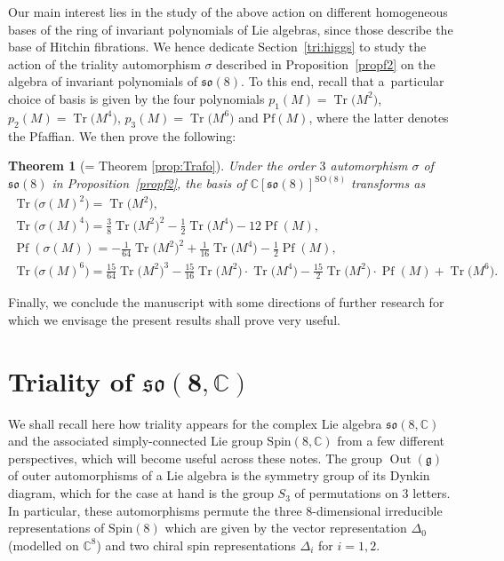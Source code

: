 \documentclass[10pt,a4paper]{amsart}
\numberwithin{equation}{section}
\newcommand{\Pf}{\operatorname{Pf}}
\newcommand{\Tr}{\operatorname{Tr}}
\newtheorem{Theorem}{Theorem}[section]
\begin{document}
Our main interest lies in the study of the above action on different homogeneous bases of the ring of invariant polynomials of Lie algebras, since those describe the base of Hitchin fibrations. We hence dedicate Section~\ref{tri:higgs} to study the action of the triality automorphism $\sigma$ described in Proposition~\ref{propf2} on the algebra of invariant polynomials of $\mathfrak{so}(8)$. To this end, recall that a~particular choice of basis is given by the four polynomials $p_1(M) = \Tr\big(M^2\big)$, $p_2 (M) = \Tr\big(M^4\big)$, $p_3 (M) = \Tr\big(M^6\big)$ and $\mathrm{Pf}(M)$, where the latter denotes the Pfaffian. We then prove the following:

\begin{Theorem}[= Theorem \ref{prop:Trafo}] Under the order $3$ automorphism $\sigma$ of $\mathfrak{so}(8)$ in Proposition~{\rm \ref{propf2}}, the basis of $\mathbb{C}[\mathfrak{so}(8)]^{\mathrm{SO}(8)}$ transforms as
\begin{gather*}
\Tr\big(\sigma(M)^2\big) = \Tr\big(M^2\big), \\
\Tr\big(\sigma(M)^4\big) = \frac{3}{8} \Tr\big(M^2\big)^2 - \frac{1}{2} \Tr\big(M^4\big) -12 \Pf (M) , \\
\Pf (\sigma(M)) = - \frac{1}{64} \Tr\big(M^2\big)^2 + \frac{1}{16} \Tr\big(M^4\big) -\frac{1}{2} \Pf (M), \\
\Tr\big(\sigma(M)^6\big) = \frac{15}{64} \Tr\big(M^2\big)^3 - \frac{15}{16} \Tr\big(M^2\big) \cdot \Tr\big(M^4\big) - \frac{15}{2} \Tr\big(M^2\big) \cdot \Pf(M) + \Tr\big(M^6\big).
\end{gather*}
\end{Theorem}

Finally, we conclude the manuscript with some directions of further research for which we envisage the present results shall prove very useful.

\section[Triality of so(8,C)]{Triality of $\boldsymbol{{\mathfrak{so}}(8, \mathbb{C})}$}\label{sec:triality}

 We shall recall here how triality appears for the complex Lie algebra ${\mathfrak{so}}(8, \mathbb{C})$ and the associated simply-connected Lie group $\mathrm{Spin}(8,\mathbb{C})$ from a few different perspectives, which will become useful across these notes. The group $\operatorname{Out}(\mathfrak{g})$ of outer automorphisms of a Lie algebra is the symmetry group of its Dynkin diagram, which for the case at hand is the group $S_3$ of permutations on 3 letters. In particular, these automorphisms permute the three 8-dimensional irreducible representations of $\mathrm{Spin}(8)$ which are given by the vector representation $\Delta_0$ (modelled on $\mathbb{C}^8$) and two chiral spin representations $\Delta_i$ for $i=1,2$.
\end{document}
